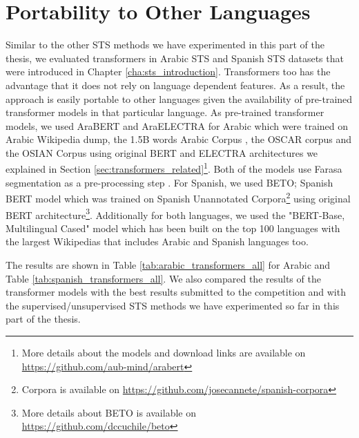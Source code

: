 \section{Portability to Other Languages}
\label{sec:transformer_multilingual}
Similar to the other STS methods we have experimented in this part of the thesis, we evaluated transformers in Arabic STS and Spanish STS datasets that were introduced in Chapter \ref{cha:sts_introduction}. Transformers too has the advantage that it does not rely on language dependent features.  As a result, the approach is easily portable to other languages given the availability of pre-trained transformer models in that particular language. As pre-trained transformer models, we used AraBERT and AraELECTRA for Arabic which were trained on Arabic Wikipedia dump, the 1.5B words Arabic Corpus \autocite{elkhair201615}, the OSCAR corpus \autocite{ortiz-suarez-etal-2020-monolingual} and the OSIAN Corpus \autocite{zeroual-etal-2019-osian} using original BERT and ELECTRA architectures we explained in Section \ref{sec:transformers_related}\footnote{More details about the models and download links are available on \url{https://github.com/aub-mind/arabert}}. Both of the models use Farasa segmentation as a pre-processing step \autocite{abdelali-etal-2016-farasa}. For Spanish, we used BETO; Spanish BERT model \autocite{CaneteCFP2020} which was trained on Spanish Unannotated Corpora\footnote{Corpora is available on \url{https://github.com/josecannete/spanish-corpora}} using original BERT architecture\footnote{More details about BETO is available on \url{https://github.com/dccuchile/beto}}. Additionally for both languages, we used the "BERT-Base, Multilingual Cased" model \autocite{devlin-etal-2019-bert} which has been built on the top 100 languages with the largest Wikipedias that includes Arabic and Spanish languages too.

The results are shown in Table \ref{tab:arabic_transformers_all} for Arabic and Table \ref{tab:spanish_transformers_all}. We also compared the results of the transformer models with the best results submitted to the competition \autocite{cer-etal-2017-semeval} and with the supervised/unsupervised STS methods we have experimented so far in this part of the thesis. 


